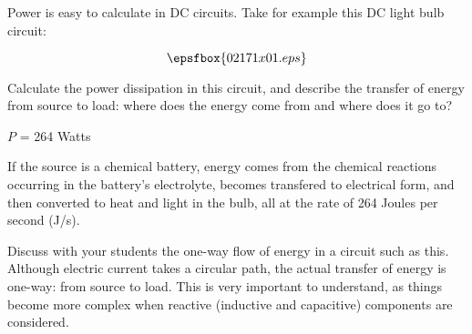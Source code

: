 

Power is easy to calculate in DC circuits.  Take for example this DC light bulb circuit:

$$\epsfbox{02171x01.eps}$$

Calculate the power dissipation in this circuit, and describe the transfer of energy from source to load: where does the energy come from and where does it go to?







$P$ = 264 Watts

\vskip 10pt

If the source is a chemical battery, energy comes from the chemical reactions occurring in the battery's electrolyte, becomes transfered to electrical form, and then converted to heat and light in the bulb, all at the rate of 264 Joules per second (J/s).







Discuss with your students the one-way flow of energy in a circuit such as this.  Although electric current takes a circular path, the actual transfer of energy is one-way: from source to load.  This is very important to understand, as things become more complex when reactive (inductive and capacitive) components are considered.




